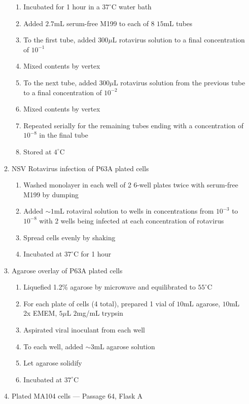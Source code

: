 \begin{enumerate}
\begin{enumerate}
			\item Incubated for 1 hour in a $37^{\circ}$C water bath
			\item Added $2.7$mL serum-free M199 to each of 8 $15$mL tubes
			\item To the first tube, added $300\mu$L rotavirus solution to a final concentration of $10^{-1}$
			\item Mixed contents by vertex
			\item To the next tube, added $300\mu$L rotavirus solution from the previous tube to a final concentration of $10^{-2}$
			\item Mixed contents by vertex
			\item Repeated serially for the remaining tubes ending with a concentration of $10^{-8}$ in the final tube
			\item Stored at $4^{\circ}$C
		\end{enumerate}
	\item NSV Rotavirus infection of P63A plated cells
		\begin{enumerate}
			\item Washed monolayer in each well of 2 6-well plates twice with serum-free M199 by dumping
			\item Added $\sim 1$mL rotaviral solution to wells in concentrations from $10^{-3}$ to $10^{-8}$ with 2 wells being infected at each concentration of rotavirus
			\item Spread cells evenly by shaking
			\item Incubated at $37^{\circ}$C for 1 hour
		\end{enumerate}
	\item Agarose overlay of P63A plated cells
		\begin{enumerate}
			\item Liquefied 1.2\% agarose by microwave and equilibrated to $55^{\circ}$C
			\item For each plate of cells (4 total), prepared 1 vial of $10$mL agarose, $10$mL 2x EMEM, $5\mu$L $2$mg/mL trypsin
			\item Aspirated viral inoculant from each well
			\item To each well, added $\sim3$mL agarose solution
			\item Let agarose solidify
			\item Incubated at $37^{\circ}$C
		\end{enumerate}
	\item Plated MA104 cells --- Passage 64, Flask A
		\begin{enumerate}

\end{enumerate}
\end{enumerate}
